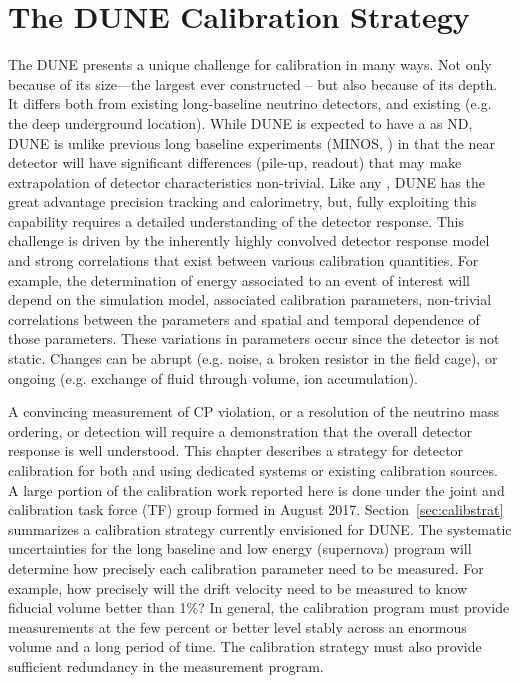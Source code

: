 \chapter{The DUNE Calibration Strategy}
\label{ch:exec-summ-calib}
The DUNE  presents a unique challenge for calibration in many ways. Not only because of its size---the largest  ever constructed -- but also because of its depth. It differs both from existing long-baseline neutrino detectors, and existing  (e.g. the deep underground location). While DUNE is expected to have a  as ND, DUNE is unlike previous long baseline experiments (MINOS, ) in that the near detector will have significant differences (pile-up, readout) that may make extrapolation of detector characteristics non-trivial.  %
Like any , DUNE has the great advantage precision tracking and calorimetry, but,  fully exploiting this capability requires a detailed understanding of the detector response. This challenge is driven by the inherently highly convolved detector response model and strong correlations that exist between various calibration quantities. For example, the determination of energy associated to an event of interest will depend on the simulation model, associated calibration parameters, non-trivial correlations between the parameters and spatial and temporal dependence of those parameters. These variations in parameters occur since the detector is not static. Changes can be abrupt (e.g. noise, a broken resistor in the field cage), or ongoing (e.g. exchange of fluid through volume, ion accumulation). 

A convincing measurement of CP violation, or a resolution of the neutrino mass ordering, or   detection will require a demonstration that the overall detector response is well understood. %
This chapter describes a strategy for detector calibration for both 
 and  using dedicated  systems or existing calibration sources. A large portion of the calibration work reported here is done under the joint  and  calibration task force (TF) group formed in August 2017.
Section~\ref{sec:calibstrat} summarizes a calibration strategy currently envisioned for DUNE. The systematic uncertainties for the long baseline and low energy (supernova) program will determine how precisely each calibration parameter need to be measured. For example, how precisely will the drift velocity need to be measured to know fiducial volume better than \num{1}\%? In general, the calibration program must provide measurements at the few percent or better level stably across an enormous volume and a long period of time. The calibration strategy must also provide sufficient redundancy in the measurement program.

